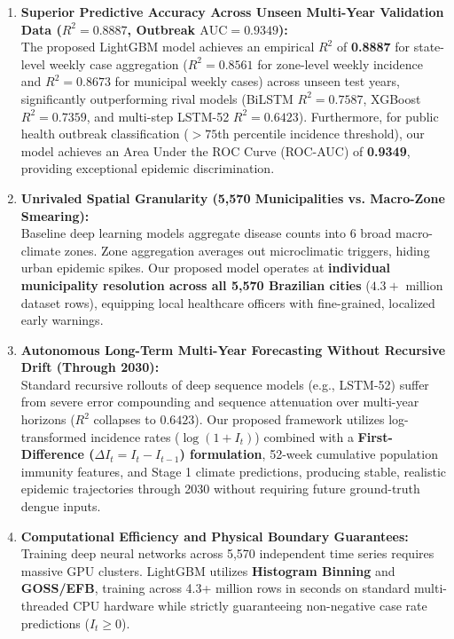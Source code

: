 \documentclass[journal,onecolumn,11pt]{IEEEtran}
\begin{document}
\begin{enumerate}
    \item \textbf{Superior Predictive Accuracy Across Unseen Multi-Year Validation Data ($R^2 = 0.8887$, Outbreak $\text{AUC} = 0.9349$):} \\
    The proposed LightGBM model achieves an empirical $R^2$ of \textbf{0.8887} for state-level weekly case aggregation ($R^2 = 0.8561$ for zone-level weekly incidence and $R^2 = 0.8673$ for municipal weekly cases) across unseen test years, significantly outperforming rival models (BiLSTM $R^2 = 0.7587$, XGBoost $R^2 = 0.7359$, and multi-step LSTM-52 $R^2 = 0.6423$). Furthermore, for public health outbreak classification ($>75$th percentile incidence threshold), our model achieves an Area Under the ROC Curve (ROC-AUC) of \textbf{0.9349}, providing exceptional epidemic discrimination.
    
    \item \textbf{Unrivaled Spatial Granularity (5,570 Municipalities vs. Macro-Zone Smearing):} \\
    Baseline deep learning models aggregate disease counts into 6 broad macro-climate zones. Zone aggregation averages out microclimatic triggers, hiding urban epidemic spikes. Our proposed model operates at \textbf{individual municipality resolution across all 5,570 Brazilian cities} ($4.3+$ million dataset rows), equipping local healthcare officers with fine-grained, localized early warnings.
    
    \item \textbf{Autonomous Long-Term Multi-Year Forecasting Without Recursive Drift (Through 2030):} \\
    Standard recursive rollouts of deep sequence models (e.g., LSTM-52) suffer from severe error compounding and sequence attenuation over multi-year horizons ($R^2$ collapses to $0.6423$). Our proposed framework utilizes log-transformed incidence rates ($\log(1 + I_t)$) combined with a \textbf{First-Difference ($\Delta I_t = I_t - I_{t-1}$) formulation}, 52-week cumulative population immunity features, and Stage 1 climate predictions, producing stable, realistic epidemic trajectories through 2030 without requiring future ground-truth dengue inputs.
    
    \item \textbf{Computational Efficiency and Physical Boundary Guarantees:} \\
    Training deep neural networks across 5,570 independent time series requires massive GPU clusters. LightGBM utilizes \textbf{Histogram Binning} and \textbf{GOSS/EFB}, training across 4.3+ million rows in seconds on standard multi-threaded CPU hardware while strictly guaranteeing non-negative case rate predictions ($I_t \ge 0$).
\end{enumerate}
\end{document}
